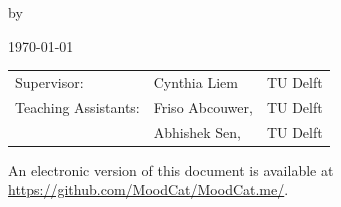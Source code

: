 \begin{titlepage}

\begin{center}


\vspace*{2\bigskipamount}

{\makeatletter
\titlestyle\color{tudelft-cyan}\Huge\@title
\makeatother}

{\makeatletter
\ifx\@subtitle\undefined\else
    \bigskip
    \titlefont\titleshape\LARGE\@subtitle
\fi
\makeatother}

\bigskip
\bigskip

by

\bigskip
\bigskip

{\makeatletter
\titlefont\Large\bfseries\@author
\makeatother}

\bigskip
\bigskip
\today

\vfill


\begin{tabular}{lll}
    Supervisor: & Cynthia Liem & TU Delft\\
    Teaching Assistants:
        & Friso Abcouwer, & TU Delft \\
        & Abhishek Sen, & TU Delft
\end{tabular}

\bigskip
\bigskip
\bigskip
\bigskip
An electronic version of this document is available at \url{https://github.com/MoodCat/MoodCat.me/}.

\end{center}

\end{titlepage}

